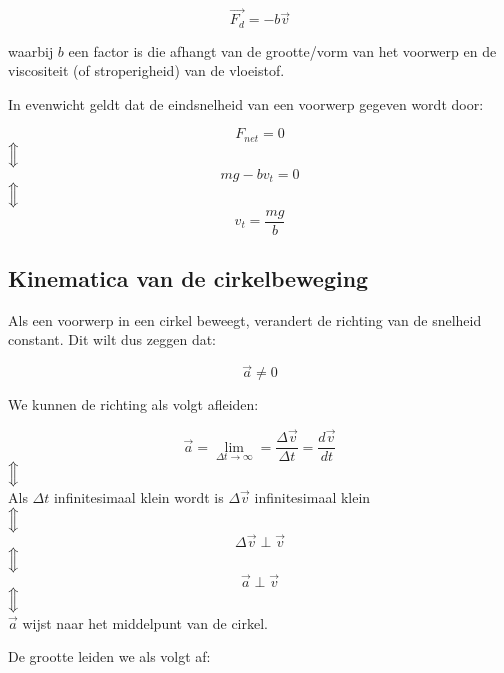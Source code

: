 \documentclass[12pt,a4paper]{article}
\newcommand{\Luda}{\Big\Updownarrow}
\begin{document}
   $$ \vec{F_{d}} = -b\vec{v} $$
   
   waarbij $b$ een factor is die afhangt van de grootte/vorm van het voorwerp en de viscositeit (of stroperigheid)
   van de vloeistof.
   
   In evenwicht geldt dat de eindsnelheid van een voorwerp gegeven wordt door:
   
   \begin{center}
   	 \[F_{net} = 0\]
	  $\Luda$\[mg - bv_{t} = 0\]
	  $\Luda$\[v_{t} = \frac{mg}{b}\]
    \end{center}	  

    \subsection{Kinematica van de cirkelbeweging}
    Als een voorwerp in een cirkel beweegt, verandert de richting van de snelheid constant. Dit wilt dus zeggen dat:
    
    $$ \vec{a} \neq 0$$
    
    We kunnen de richting als volgt afleiden:
    
    \begin{center}
    	\[\vec{a} = \lim_{\Delta t\to\infty} = \frac{\Delta \vec{v}}{\Delta t} = \frac{d\vec{v}}{dt}\]
    	$\Luda$\\
    	Als $\Delta t$ infinitesimaal klein wordt is $\Delta \vec{v}$ infinitesimaal klein\\
    	$\Luda$\[\Delta\vec{v} \perp \vec{v}\]
    	$\Luda$\[\vec{a} \perp \vec{v}\]
    	$\Luda$\\ 
    	$\vec{a}$ wijst naar het middelpunt van de cirkel.
    \end{center}
    
    De grootte leiden we als volgt af:
    
\end{document}
